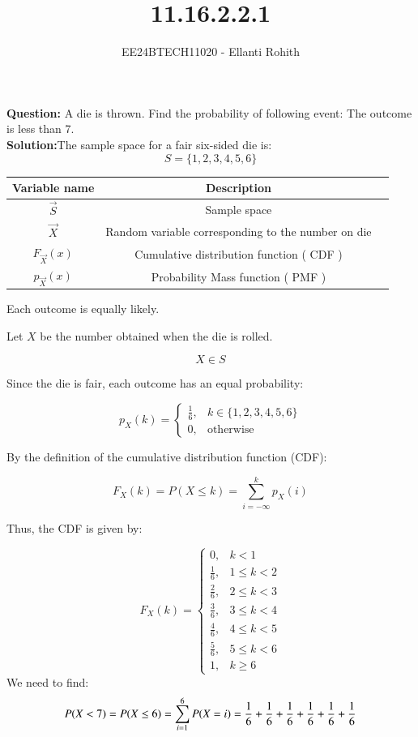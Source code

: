 \documentclass[journal]{IEEEtran}
\begin{document}

\vspace{3cm}



\title{11.16.2.2.1}
\author{EE24BTECH11020 - Ellanti Rohith}
{\let\newpage\relax\maketitle}
\textbf{Question:} A die is thrown. Find the probability of following event: The outcome is less than 7.
\\
\textbf{Solution:}The sample space for a fair six-sided die is:
\[
S = \{1,2,3,4,5,6\}
\]
\begin{center}
\begin{tabular}{|c|c|c|}
\hline 
\textbf{Variable name} & \textbf{Description} \\
\hline 
$\vec{S}$ & Sample space \\
\hline 
$\vec{X}$ & Random variable corresponding to the number on die \\
\hline

$F_{\vec{X}} (x)$ & Cumulative distribution function ( CDF ) \\
\hline
$p_{\vec{X}} (x)$ & Probability Mass function ( PMF ) \\
\hline
\end{tabular}
\end{center}
Each outcome is equally likely.

Let \( X \) be the number obtained when the die is rolled.

\[
X \in S
\]


Since the die is fair, each outcome has an equal probability:

\[
p_X(k) =
\begin{cases}
\frac{1}{6}, & k \in \{1,2,3,4,5,6\} \\
0, & \text{otherwise}
\end{cases}
\]

By the definition of the cumulative distribution function (CDF):

\[
F_X(k) = P(X \leq k) = \sum_{i=-\infty}^{k} p_X(i)
\]

Thus, the CDF is given by:

\[
F_X(k) =
\begin{cases}
0, & k < 1 \\
\frac{1}{6}, & 1 \leq k < 2 \\
\frac{2}{6}, & 2 \leq k < 3 \\
\frac{3}{6}, & 3 \leq k < 4 \\
\frac{4}{6}, & 4 \leq k < 5 \\
\frac{5}{6}, & 5 \leq k < 6 \\
1, & k \geq 6
\end{cases}
\]
We need to find:
\[
P(X < 7) = P(X \leq 6) = \sum_{i=1}^{6} P(X = i)\\
= \frac{1}{6} + \frac{1}{6} + \frac{1}{6} + \frac{1}{6} + \frac{1}{6} + \frac{1}{6}
\]
\end{document}
